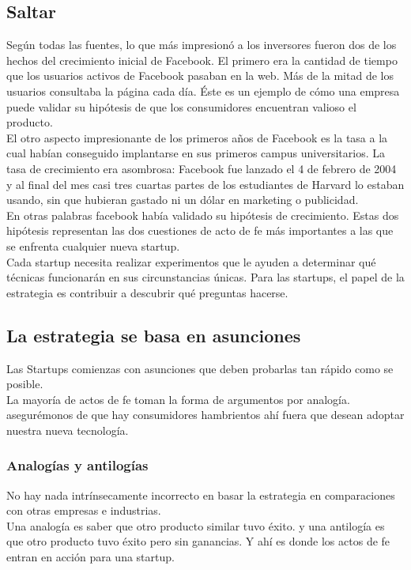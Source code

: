 \documentclass[10pt]{article}
\begin{document}
\begin{multicols}{2}
\section*{Saltar}
{\color{blue} Según todas las fuentes, lo que más impresionó a los inversores fueron dos de los hechos del crecimiento inicial de Facebook. El primero era la cantidad de tiempo que los usuarios activos de Facebook pasaban en la web. Más de la mitad de los usuarios consultaba la página cada día. Éste es un ejemplo de cómo una empresa puede validar su hipótesis de que los consumidores encuentran valioso el producto.\\
 El otro aspecto impresionante de los primeros años de Facebook es la tasa a la cual habían conseguido implantarse en sus primeros campus universitarios. La tasa de crecimiento era asombrosa: Facebook fue lanzado el 4 de febrero de 2004 y al final del mes casi tres cuartas partes de los estudiantes de Harvard lo estaban usando, sin que hubieran gastado ni un dólar en marketing o publicidad.}\\
En otras palabras facebook había validado su hipótesis de crecimiento. Estas dos hipótesis representan las dos cuestiones de acto de fe más importantes a las que se enfrenta cualquier nueva startup.\\
Cada startup necesita realizar experimentos que le ayuden a determinar qué técnicas funcionarán en sus circunstancias únicas. Para las startups, el papel de la estrategia es contribuir a descubrir qué preguntas hacerse.
\subsection*{La estrategia se basa en asunciones}
Las Startups comienzas con asunciones que deben probarlas tan rápido como se posible.\\
La mayoría de actos de fe toman la forma de argumentos por analogía.
{\color{blue}asegurémonos de que hay consumidores hambrientos ahí fuera que desean adoptar nuestra nueva tecnología.}
\subsubsection*{Analogías y antilogías}
No hay nada intrínsecamente incorrecto en basar la estrategia en comparaciones con otras empresas e industrias. \\
Una analogía es saber que otro producto similar tuvo éxito. y una antilogía es que otro producto tuvo éxito pero sin ganancias. Y ahí es donde los actos de fe entran en acción para una startup. 

\end{multicols}
\end{document}
